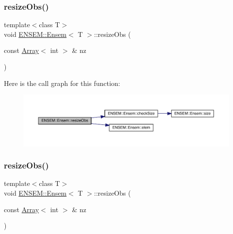 \subsubsection{\texorpdfstring{resizeObs()}{resizeObs()}\hspace{0.1cm}{\footnotesize\ttfamily [10/12]}}
{\footnotesize\ttfamily template$<$class T$>$ \\
void \mbox{\hyperlink{classENSEM_1_1Ensem}{E\+N\+S\+E\+M\+::\+Ensem}}$<$ T $>$\+::resize\+Obs (\begin{DoxyParamCaption}\item[{const \mbox{\hyperlink{classXMLArray_1_1Array}{Array}}$<$ int $>$ \&}]{nz }\end{DoxyParamCaption})\hspace{0.3cm}{\ttfamily [inline]}}

Here is the call graph for this function\+:
\nopagebreak
\begin{figure}[H]
\begin{center}
\leavevmode
\includegraphics[width=350pt]{d7/d3e/classENSEM_1_1Ensem_a4acf05018e5c49c0053dbe8cf76a4252_cgraph}
\end{center}
\end{figure}
\mbox{\label{classENSEM_1_1Ensem_a4acf05018e5c49c0053dbe8cf76a4252}} 
\subsubsection{\texorpdfstring{resizeObs()}{resizeObs()}\hspace{0.1cm}{\footnotesize\ttfamily [11/12]}}
{\footnotesize\ttfamily template$<$class T$>$ \\
void \mbox{\hyperlink{classENSEM_1_1Ensem}{E\+N\+S\+E\+M\+::\+Ensem}}$<$ T $>$\+::resize\+Obs (\begin{DoxyParamCaption}\item[{const \mbox{\hyperlink{classXMLArray_1_1Array}{Array}}$<$ int $>$ \&}]{nz }\end{DoxyParamCaption})\hspace{0.3cm}{\ttfamily [inline]}}

